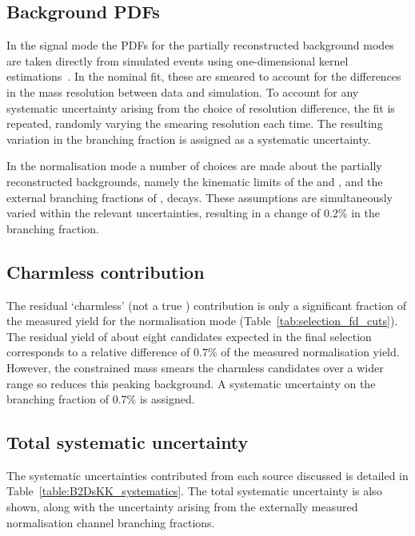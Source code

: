 \subsection{Background PDFs}

In the signal mode the PDFs for the partially reconstructed background modes are taken directly from simulated events using one-dimensional kernel estimations~\cite{Cranmer:2000du}. In the nominal fit, these are smeared to account for the differences in the mass resolution between data and simulation. To account for any systematic uncertainty arising from the choice of resolution difference, the fit is repeated, randomly varying the smearing resolution each time. The resulting variation in the branching fraction is assigned as a systematic uncertainty. 

In the normalisation mode a number of choices are made about the partially reconstructed backgrounds, namely the kinematic limits of the \decay{\Bp}{\Dssp\Dzb} and \decay{\Bp}{\Dsp\Dstarzb}, and the external branching fractions of \decay{\Dssp}{\Dsp[\Pgamma/\piz]},
 \decay{\Dstarzb}{\Dzb[\Pgamma/\piz]} decays. These assumptions are simultaneously varied within the relevant uncertainties, resulting in a change of 0.2\% in the branching fraction.



\subsection{Charmless contribution}

The residual `charmless' (not a true \Dsp) contribution is only a significant fraction of the measured yield for the normalisation mode (Table~\ref{tab:selection_fd_cuts}). The residual yield of about eight candidates expected in the final selection corresponds to a relative difference of 0.7\% of the measured normalisation yield. However, the constrained \Dsp mass smears the charmless candidates over a wider range so reduces this peaking background.
A systematic uncertainty on the branching fraction of 0.7\% is assigned.



\subsection{Total systematic uncertainty}
The systematic uncertainties contributed from each source discussed is detailed in Table~\ref{table:B2DsKK_systematics}. The total systematic uncertainty is also shown, along with the uncertainty arising from the externally measured normalisation channel branching fractions. 

